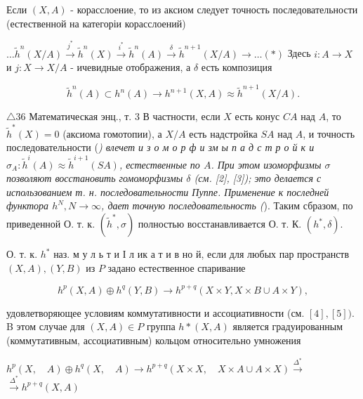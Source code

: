 \documentclass[10pt]{article}
\begin{document}
Если $(X, A)$ - корасслоение, то из аксиом следует точность последовательности (естественной на категоріи корасслоений)



$\ldots \tilde{h}^{n}(X / A) \stackrel{j^{*}}{\rightarrow} \tilde{h}^{n}(X) \stackrel{i^{*}}{\longrightarrow} \tilde{h}^{n}(A) \stackrel{\delta}{\longrightarrow} \tilde{h}^{n+1}(X / A) \rightarrow \ldots(*)$ Здесь $i: A \rightarrow X$ и $j: X \rightarrow X / A$ - ичевидные отображения, а $\delta$ есть композиция



\[

\tilde{h}^{n}(A) \subset h^{n}(A) \rightarrow h^{n+1}(X, A) \approx \tilde{h}^{n+1}(X / A) .

\]



$\triangle 36$ Математическая энц., т. 3 В частности, если $X$ есть конус $C A$ над $A$, то $\tilde{h}^{*}(X)=0$ (аксиома гомотопии), а $X / A$ есть надстройка $S A$ над $A$, и точность последовательности (\textit{) влечет и з о м о р ф и зм ы п а д с т р о й к и $\sigma_{A}: \tilde{h}^{i}(A) \approx \tilde{h}^{i+1}(S A)$, естественные по $A$. При этом изоморфизмы $\sigma$ позволяют восстановить гомоморфизмы $\delta$ (см. [2], [3]); это делается с использованием т. н. последовательности Пуппе. Применение к последней функтора $h^{N}, N \rightarrow \infty$, дает точную последовательность (}). Таким сбразом, по приведенной О. т. к. $\left(\tilde{h}^{*}, \sigma\right)$ полностью восстанавливается О. т. К. $\left(h^{*}, \delta\right)$.



О. т. к. $h^{*}$ наз. м у л ь т и І л ик а т и в но й, если для любых пар пространств $(X, A),(Y, B)$ из $P$ задано естественное спаривание



\[

h^{p}(X, A) \oplus h^{q}(Y, B) \rightarrow h^{p+q}(X \times Y, X \times B \cup A \times Y),

\]



удовлетворяющее условиям коммутативности и ассоциативности (см. $[4],[5])$. B этом случае для $(X, A) \in P$ группа $h *(X, A)$ является градуированным (коммутативным, ассоциативным) кольцом относительно умножения



$h^{p}(X, \quad A) \oplus h^{q}(X, \quad A) \rightarrow h^{p+q}(X \times X, \quad X \times A \cup A \times X) \stackrel{\Delta^{*}}{\rightarrow}$ $\stackrel{\Delta^{*}}{\rightarrow} h^{p+q}(X, A)$
\end{document}
